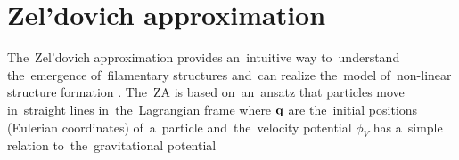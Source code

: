 \section{Zel'dovich approximation}
The~Zel'dovich approximation \parencite[hereafter ZA;][]{1970A&A.....5...84Z} provides an~intuitive way to~understand the~emergence of~filamentary structures and~can realize the~model of~non-linear structure formation \parencite{2014MNRAS.439.3630W}. The~ZA is based on~an~ansatz that particles move in~straight lines in~the~Lagrangian frame
where $\mathbf q$ are the~initial positions (Eulerian coordinates) of~a~particle and~the~velocity potential $\phi_V$ has a~simple relation to~the~gravitational potential



